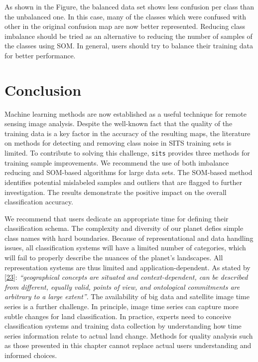 \documentclass[
  11pt,
]{report}
\newcommand{\passthrough}[1]{#1}
\begin{document}
As shown in the Figure, the balanced data set shows less confusion per
class than the unbalanced one. In this case, many of the classes which
were confused with other in the original confusion map are now better
represented. Reducing class imbalance should be tried as an alternative
to reducing the number of samples of the classes using SOM. In general,
users should try to balance their training data for better performance.

\hypertarget{conclusion}{%
\section*{Conclusion}\label{conclusion}}

Machine learning methods are now established as a useful technique for
remote sensing image analysis. Despite the well-known fact that the
quality of the training data is a key factor in the accuracy of the
resulting maps, the literature on methods for detecting and removing
class noise in SITS training sets is limited. To contribute to solving
this challenge, \passthrough{\lstinline!sits!} provides three methods
for training sample improvements. We recommend the use of both imbalance
reducing and SOM-based algorithms for large data sets. The SOM-based
method identifies potential mislabeled samples and outliers that are
flagged to further investigation. The results demonstrate the positive
impact on the overall classification accuracy.

We recommend that users dedicate an appropriate time for defining their
classification schema. The complexity and diversity of our planet defies
simple class names with hard boundaries. Because of representational and
data handling issues, all classification systems will have a limited
number of categories, which will fail to properly describe the nuances
of the planet's landscapes. All representation systems are thus limited
and application-dependent. As stated by
\protect\hyperlink{ref-Janowicz2012}{{[}23{]}}: \emph{``geographical
concepts are situated and context-dependent, can be described from
different, equally valid, points of view, and ontological commitments
are arbitrary to a large extent''}. The availability of big data and
satellite image time series is a further challenge. In principle, image
time series can capture more subtle changes for land classification. In
practice, experts need to conceive classification systems and training
data collection by understanding how time series information relate to
actual land change. Methods for quality analysis such as those presented
in this chapter cannot replace actual users understanding and informed
choices.
\end{document}
